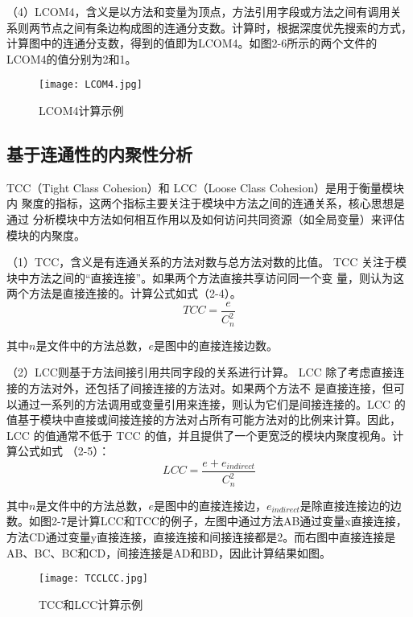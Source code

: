（4）LCOM4，含义是以方法和变量为顶点，方法引用字段或方法之间有调用关系则两节点之间有条边构成图的连通分支数\cite{1995Measuring}。计算时，根据深度优先搜索的方式，计算图中的连通分支数，得到的值即为LCOM4。如图2-6所示的两个文件的LCOM4的值分别为2和1。

\begin{figure}[h]
\centering
\texttt{[image: LCOM4.jpg]}
\caption{LCOM4计算示例}
\end{figure}

\subsection{基于连通性的内聚性分析}
TCC（Tight Class Cohesion）和 LCC（Loose Class Cohesion）是用于衡量模块内
聚度的指标，这两个指标主要关注于模块中方法之间的连通关系，核心思想是通过
分析模块中方法如何相互作用以及如何访问共同资源（如全局变量）来评估模块的内聚度。


（1）TCC，含义是有连通关系的方法对数与总方法对数的比值\cite{1995Cohesion}。
TCC 关注于模块中方法之间的“直接连接”。如果两个方法直接共享访问同一个变
量，则认为这两个方法是直接连接的。计算公式如式（2-4）。
\begin{equation}
{TCC} = \frac{e}{C_{n}^{2}}
\end{equation}

其中\(n\)是文件中的方法总数，\(e\)是图中的直接连接边数。

（2）LCC则基于方法间接引用共同字段的关系进行计算\cite{1995Cohesion}。
LCC 除了考虑直接连接的方法对外，还包括了间接连接的方法对。如果两个方法不
是直接连接，但可以通过一系列的方法调用或变量引用来连接，则认为它们是间接连接的。LCC 的值基于模块中直接或间接连接的方法对占所有可能方法对的比例来计算。因此，LCC 的值通常不低于 TCC 的值，并且提供了一个更宽泛的模块内聚度视角。计算公式如式 （2-5）：
\begin{equation}
{LCC=\frac{e+e_{indirect}}{C_{n}^{2}}}
\end{equation}

其中\(n\)是文件中的方法总数，\(e\)是图中的直接连接边，\(e_{indirect}\)是除直接连接边的边数。如图2-7是计算LCC和TCC的例子，左图中通过方法AB通过变量x直接连接，方法CD通过变量y直接连接，直接连接和间接连接都是2。而右图中直接连接是AB、BC、BC和CD，间接连接是AD和BD，因此计算结果如图。

\begin{figure}[h]
\centering
\texttt{[image: TCCLCC.jpg]}
\caption{TCC和LCC计算示例}
\end{figure}


